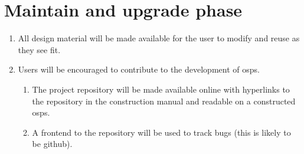 \documentclass[12pt,a4paper]{article}
\begin{document}
\section{Maintain and upgrade phase}
\begin{enumerate}
\item All design material will be made available for the user to modify and reuse as they see fit.
\item Users will be encouraged to contribute to the development of \gls{osps}.
	\begin{enumerate}[label*=\arabic*.]
	\item The project repository will be made available online with hyperlinks to the repository in the construction manual and readable on a constructed \gls{osps}. 
	\item A frontend to the repository will be used to track bugs (this is likely to be github).
	\end{enumerate}
\end{enumerate}
\end{document}
